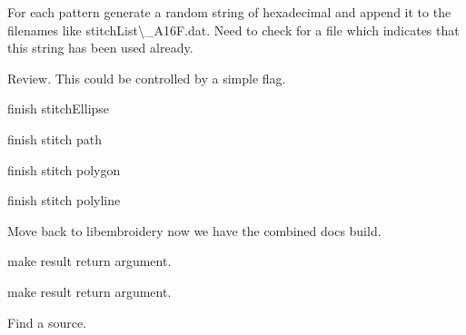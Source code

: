 \begin{DoxyRefList}
\label{todo__todo000398}%
%
For each pattern generate a random string of hexadecimal and append it to the filenames like {\ttfamily stitch\+List\textbackslash{}\+\_\+\+A16\+F.\+dat}. Need to check for a file which indicates that this string has been used already. 
\item[Global \mbox{\hyperlink{geometry_8c_ae6461f57f08ce5992c70fa9897988644}{emb\+Geometry\+\_\+vulcanize}} (Emb\+Geometry $\ast$obj)]\label{todo__todo000421}%
%
Review. This could be controlled by a simple flag.  
\item[Global \mbox{\hyperlink{fill_8c_a63bc84e4406e59c092a2e076afedf930}{emb\+Pattern\+\_\+stitch\+Ellipse}} (Emb\+Pattern $\ast$p, Emb\+Ellipse ellipse, int thread\+\_\+index, int style)]\label{todo__todo000407}%
%
finish stitch\+Ellipse  
\item[Global \mbox{\hyperlink{fill_8c_a130b4030da774600c6005183dabb2d28}{emb\+Pattern\+\_\+stitch\+Path}} (Emb\+Pattern $\ast$p, Emb\+Path rect, int thread\+\_\+index, int style)]\label{todo__todo000408}%
%
finish stitch path  
\item[Global \mbox{\hyperlink{fill_8c_a6e95b120116c16767cecbd2284ce1e7b}{emb\+Pattern\+\_\+stitch\+Polygon}} (Emb\+Pattern $\ast$p, Emb\+Polygon rect, int thread\+\_\+index, int style)]\label{todo__todo000409}%
%
finish stitch polygon  
\item[Global \mbox{\hyperlink{fill_8c_a18bde39bfa17dfb7fe07137d62260e5c}{emb\+Pattern\+\_\+stitch\+Polyline}} (Emb\+Pattern $\ast$p, Emb\+Polyline rect, int thread\+\_\+index, int style)]\label{todo__todo000410}%
%
finish stitch polyline  
\item[Page \mbox{\hyperlink{md_extern_libembroidery_src_embroider_cli}{embroider\+\_\+cli}} ]\label{todo__todo000399}%
%
Move back to libembroidery now we have the combined docs build. 
\item[Global \mbox{\hyperlink{vector_8c_a0a4af07bfac410623cf77a35a11550b1}{emb\+Vector\+\_\+multiply}} (Emb\+Vector vector, Emb\+Real magnitude, Emb\+Vector $\ast$result)]\label{todo__todo000432}%
%
make result return argument.  
\item[Global \mbox{\hyperlink{vector_8c_aaad72d90c58592e330de08139aee5077}{emb\+Vector\+\_\+normalize}} (Emb\+Vector vector, Emb\+Vector $\ast$result)]\label{todo__todo000431}%
%
make result return argument.  
\item[Page \mbox{\hyperlink{md_extern_libembroidery_src_formats_formats}{Formats}} ]\label{todo__todo000435}%
%
Find a source.


\end{DoxyRefList}

